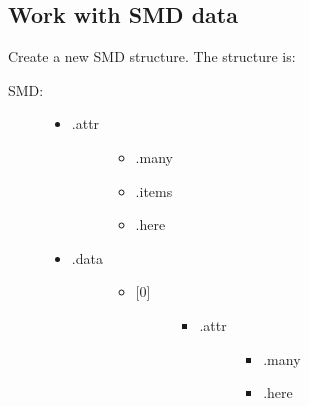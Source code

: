 \documentclass[letterpaper,10pt,english]{sphinxmanual}
\begin{document}
\subsection{Work with SMD data}
\label{code_smd:work-with-smd-data}\label{code_smd:module-smd}

\begin{fulllineitems}
\label{code_smd:smd.new}
Create a new SMD structure. The structure is:
\begin{description}
\item[{SMD:}] \leavevmode\begin{itemize}
\item {} \begin{description}
\item[{.attr }] \leavevmode\begin{itemize}
\item {} 
.many

\item {} 
.items

\item {} 
.here

\end{itemize}

\end{description}

\item {} \begin{description}
\item[{.data }] \leavevmode\begin{itemize}
\item {} \begin{description}
\item[{{[}0{]} }] \leavevmode\begin{itemize}
\item {} \begin{description}
\item[{.attr }] \leavevmode\begin{itemize}
\item {} 
.many

\item {} 
.here

\end{itemize}

\end{description}


\end{itemize}
\end{description}
\end{itemize}
\end{description}
\end{itemize}
\end{description}
\end{fulllineitems}
\end{document}
